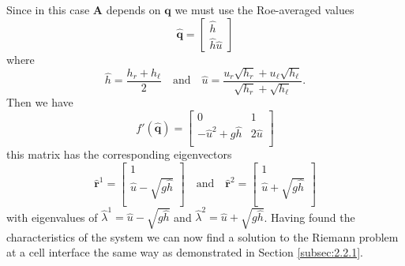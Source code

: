 \documentclass[twoside]{bsu-ms}
\begin{document}
Since in this case $\mathbf{A}$ depends on $\mathbf{q}$ we must use the Roe-averaged values
\begin{equation}\label{eq:2.36}
    \mathbf{\hat{q}}=\begin{bmatrix}
        \widehat{h}\\
        \widehat{h}\widehat{u}
    \end{bmatrix}
\end{equation}
where
\begin{equation}\label{eq:2.37}
    \widehat{h}=\frac{h_{r}+h_{\ell}}{2}\quad\text{and}\quad\widehat{u}=\frac{u_{r}\sqrt{h_{r}}+u_{\ell}\sqrt{h_{\ell}}}{\sqrt{h_{r}}+\sqrt{h_{\ell}}}.
\end{equation}
Then we have
\begin{equation}\label{eq:2.38}
f'(\mathbf{\widehat{q}})=\begin{bmatrix}
        0&1\\
        -\widehat{u}^2+g\widehat{h}&2\widehat{u}\\
    \end{bmatrix}
\end{equation}
this matrix has the corresponding eigenvectors 
\begin{equation}\label{eq:2.39}
    \mathbf{\widehat{r}}^{1}=\begin{bmatrix}
        1\\
        \widehat{u}-\sqrt{g\widehat{h}}\\
    \end{bmatrix}\quad\text{and}\quad
    \mathbf{\widehat{r}}^{2}=\begin{bmatrix}
        1\\
        \widehat{u}+\sqrt{g\widehat{h}}\\
    \end{bmatrix}
\end{equation} with eigenvalues of $\widehat{\lambda}^1=\widehat{u}-\sqrt{g\widehat{h}}$ and $\widehat{\lambda}^2=\widehat{u}+\sqrt{g\widehat{h}}$. Having found the characteristics of the system we can now find a solution to the Riemann problem at a cell interface the same way as demonstrated in Section \ref{subsec:2.2.1}.
\end{document}
